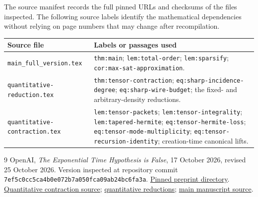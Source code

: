 \documentclass[11pt]{article}
\theoremstyle{remark}
\begin{document}
The source manifest records the full pinned URLs and checksums of the files inspected. The following source labels identify the mathematical dependencies without relying on page numbers that may change after recompilation.
\begin{center}
\small
\begin{tabular}{p{}p{}}
\toprule
Source file & Labels or passages used\\
\midrule
\texttt{main\_full\_version.tex} & \texttt{thm:main}; \texttt{lem:total-order}; \texttt{lem:sparsify}; \texttt{cor:max-sat-approximation}.\\
\texttt{quantitative-reduction.tex} & \texttt{thm:tensor-contraction}; \texttt{eq:sharp-incidence-degree}; \texttt{eq:sharp-wire-budget}; the fixed- and arbitrary-density reductions.\\
\texttt{quantitative-contraction.tex} & \texttt{lem:tensor-packets}; \texttt{lem:tensor-integrality}; \texttt{lem:tapered-hermite}; \texttt{eq:tensor-hermite-loss}; \texttt{eq:tensor-mode-multiplicity}; \texttt{eq:tensor-recursion-identity}; creation-time canonical lifts.\\
\bottomrule
\end{tabular}
\end{center}

\begin{thebibliography}{9}
OpenAI, \emph{The Exponential Time Hypothesis is False}, 17 October 2026, revised 25 October 2026. Version inspected at repository commit \texttt{7ef5c0cc5ca4b0e072b7a050fca09ab24bc6fa3a}.\newline
\href{https://github.com/openai/math/tree/7ef5c0cc5ca4b0e072b7a050fca09ab24bc6fa3a/preprints/The-Exponential-Time-Hypothesis-is-False-October-25-2026}{Pinned preprint directory}.\newline
\href{https://github.com/openai/math/blob/7ef5c0cc5ca4b0e072b7a050fca09ab24bc6fa3a/preprints/The-Exponential-Time-Hypothesis-is-False-October-25-2026/build/quantitative-contraction.tex}{Quantitative contraction source};
\href{https://github.com/openai/math/blob/7ef5c0cc5ca4b0e072b7a050fca09ab24bc6fa3a/preprints/The-Exponential-Time-Hypothesis-is-False-October-25-2026/build/quantitative-reduction.tex}{quantitative reductions};
\href{https://github.com/openai/math/blob/7ef5c0cc5ca4b0e072b7a050fca09ab24bc6fa3a/preprints/The-Exponential-Time-Hypothesis-is-False-October-25-2026/build/main_full_version.tex}{main manuscript source}.
\end{thebibliography}
\end{document}
